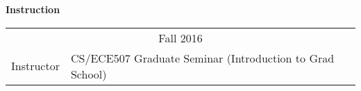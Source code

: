 \documentclass[10pt]{article}
\begin{document}
\vspace{10pt}

\textbf{Instruction} \\
\vspace{-10pt}
\noindent\begin{tabular}{p{3cm}p{9.5cm}}
\multicolumn{2}{c}{Fall 2016}\\
Instructor & CS/ECE507 Graduate Seminar (Introduction to Grad School)\\


\end{tabular}\\
\vspace{10pt}




\end{document}
